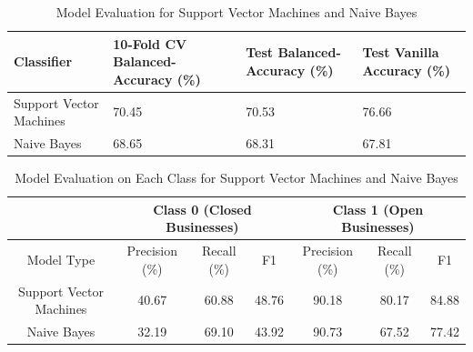 \documentclass{article}
\begin{document}
\begin{table}[hbpt]
\begin{tabular}{p{4cm}|p{4cm}|p{3.5cm} |p{3.5cm} } 
 \hline

 Classifier & 10-Fold CV Balanced-Accuracy (\%) & Test Balanced-Accuracy (\%) & Test Vanilla Accuracy (\%)\\
 \hline
 Support Vector Machines  & 70.45 & 70.53  & 76.66\\
 Naive Bayes & 68.65 & 68.31  & 67.81 \\
 \hline

\end{tabular}
  \caption{Model Evaluation for  Support Vector Machines  and Naive Bayes} 
  \vspace{-2ex}
  \label{tab:table1}
\end{table}




\begin{table}[hbpt]
\centering
\begin{tabular}{ c|c|c|c|c|c|c }
 \hline
 ~& \multicolumn{3}{c|}{Class 0 (Closed Businesses)} & \multicolumn{3}{c}{Class 1 (Open Businesses)}  \\
 \hline
Model Type & Precision (\%) & Recall (\%) & F1  & Precision (\%) & Recall (\%) & F1 \\
 \hline
 Support Vector Machines & 40.67 & 60.88  & 48.76  & 90.18 & 80.17 & 84.88
 \\

  Naive Bayes & 32.19 & 69.10 & 43.92 & 90.73 & 67.52 & 77.42
 \\
 
 \hline

\end{tabular}
  \caption{Model Evaluation on Each Class for Support Vector Machines  and Naive Bayes} 
  \vspace{-2ex}
  \label{tab:table_class}
\end{table}
\end{document}
